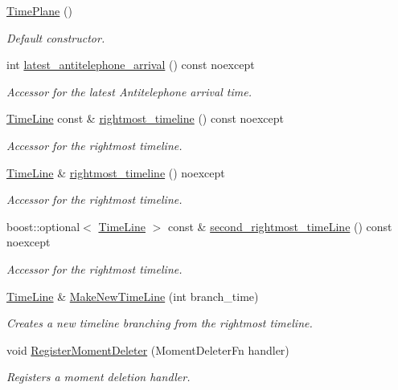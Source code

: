 \begin{DoxyCompactItemize}
\item 
\hyperlink{classtimeplane_1_1_time_plane_a8d8f1227ade6490fa8b814f1b7f18ecc}{Time\+Plane} ()
\begin{DoxyCompactList}\small\item\em Default constructor. \end{DoxyCompactList}\item 
int \hyperlink{classtimeplane_1_1_time_plane_ae66d15a7ce9adb5f63906011a455400b}{latest\+\_\+antitelephone\+\_\+arrival} () const noexcept
\begin{DoxyCompactList}\small\item\em Accessor for the latest Antitelephone arrival time. \end{DoxyCompactList}\item 
\hyperlink{classtimeplane_1_1_time_line}{Time\+Line} const  \& \hyperlink{classtimeplane_1_1_time_plane_adec17c7b3931df31bd14478f55df5821}{rightmost\+\_\+timeline} () const noexcept
\begin{DoxyCompactList}\small\item\em Accessor for the rightmost timeline. \end{DoxyCompactList}\item 
\hyperlink{classtimeplane_1_1_time_line}{Time\+Line} \& \hyperlink{classtimeplane_1_1_time_plane_a317c9e247011cf5f4e6e36f2f7651932}{rightmost\+\_\+timeline} () noexcept
\begin{DoxyCompactList}\small\item\em Accessor for the rightmost timeline. \end{DoxyCompactList}\item 
boost\+::optional$<$ \hyperlink{classtimeplane_1_1_time_line}{Time\+Line} $>$ const  \& \hyperlink{classtimeplane_1_1_time_plane_aa7c579aa9eda4aebd505ff8b473a3be4}{second\+\_\+rightmost\+\_\+time\+Line} () const noexcept
\begin{DoxyCompactList}\small\item\em Accessor for the rightmost timeline. \end{DoxyCompactList}\item 
\hyperlink{classtimeplane_1_1_time_line}{Time\+Line} \& \hyperlink{classtimeplane_1_1_time_plane_ab8c82092c1c5c3f18c8677f8ce38662c}{Make\+New\+Time\+Line} (int branch\+\_\+time)
\begin{DoxyCompactList}\small\item\em Creates a new timeline branching from the rightmost timeline. \end{DoxyCompactList}\item 
void \hyperlink{classtimeplane_1_1_time_plane_a22be7b27d461dcb849f48c149a044502}{Register\+Moment\+Deleter} (Moment\+Deleter\+Fn handler)
\begin{DoxyCompactList}\small\item\em Registers a moment deletion handler. \end{DoxyCompactList}\end{DoxyCompactItemize}
